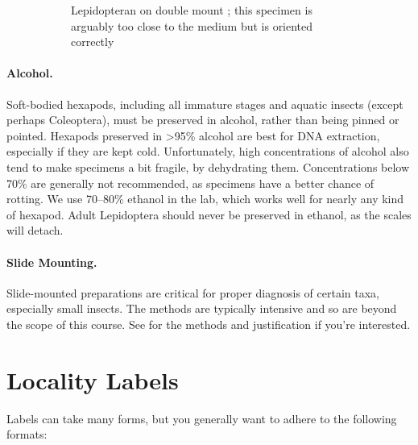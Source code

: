 \documentclass[letterpaper, 11pt]{article}
\begin{document}
\begin{figure}[ht!]
\begin{subfigure}[ht!]{0.42\textwidth}
        \caption{Lepidopteran on double mount \citep[modified from][Fig. 18D]{USDAmanual1986}; this specimen is arguably too close to the medium but is oriented correctly}
        \label{fig:mothmount}
    \end{subfigure}
    \caption{}
\end{figure}

\paragraph*{Alcohol.} Soft-bodied hexapods, including all immature stages and aquatic insects (except perhaps Coleoptera), must be preserved in alcohol, rather than being pinned or pointed. Hexapods preserved in \textgreater95\% alcohol are best for DNA extraction, especially if they are kept cold. Unfortunately, high concentrations of alcohol also tend to make specimens a bit fragile, by dehydrating them. Concentrations below 70\% are generally not recommended, as specimens have a better chance of rotting. We use 70--80\% ethanol in the lab, which works well for nearly any kind of hexapod. Adult Lepidoptera should never be preserved in ethanol, as the scales will detach.

\paragraph*{Slide Mounting.} Slide-mounted preparations are critical for proper diagnosis of certain taxa, especially small insects. The methods are typically intensive and so are beyond the scope of this course. See \cite{SlideMounting} for the methods and justification if you're interested.

\section*{Locality Labels}
Labels can take many forms, but you generally want to adhere to the following formats:
\end{document}
